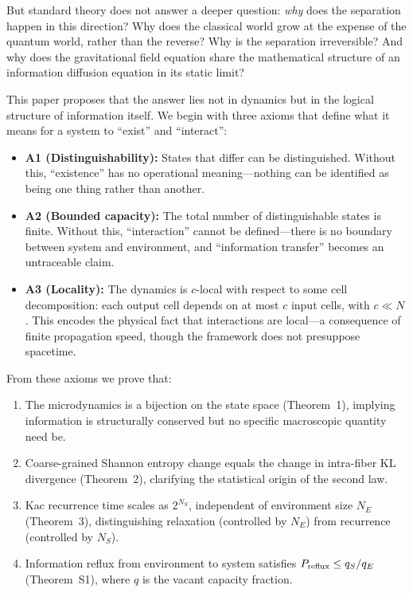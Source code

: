 \documentclass[reprint]{revtex4-2}
\begin{document}
But standard theory does not answer a deeper question: \emph{why} does the separation happen in this direction? Why does the classical world grow at the expense of the quantum world, rather than the reverse? Why is the separation irreversible? And why does the gravitational field equation share the mathematical structure of an information diffusion equation in its static limit?

This paper proposes that the answer lies not in dynamics but in the logical structure of information itself. We begin with three axioms that define what it means for a system to ``exist'' and ``interact'':

\begin{itemize}
\item \textbf{A1 (Distinguishability):} States that differ can be distinguished. Without this, ``existence'' has no operational meaning---nothing can be identified as being one thing rather than another.
\item \textbf{A2 (Bounded capacity):} The total number of distinguishable states is finite. Without this, ``interaction'' cannot be defined---there is no boundary between system and environment, and ``information transfer'' becomes an untraceable claim.
\item \textbf{A3 (Locality):} The dynamics is $c$-local with respect to some cell decomposition: each output cell depends on at most $c$ input cells, with $c\ll N$. This encodes the physical fact that interactions are local---a consequence of finite propagation speed, though the framework does not presuppose spacetime.
\end{itemize}

From these axioms we prove that:
\begin{enumerate}
\item The microdynamics is a bijection on the state space (Theorem~1), implying information is structurally conserved but no specific macroscopic quantity need be.
\item Coarse-grained Shannon entropy change equals the change in intra-fiber KL divergence (Theorem~2), clarifying the statistical origin of the second law.
\item Kac recurrence time scales as $2^{N_S}$, independent of environment size $N_E$ (Theorem~3), distinguishing relaxation (controlled by $N_E$) from recurrence (controlled by $N_S$).
\item Information reflux from environment to system satisfies $P_{\rm reflux}\le q_S/q_E$ (Theorem~S1), where $q$ is the vacant capacity fraction.
\end{enumerate}
\end{document}
